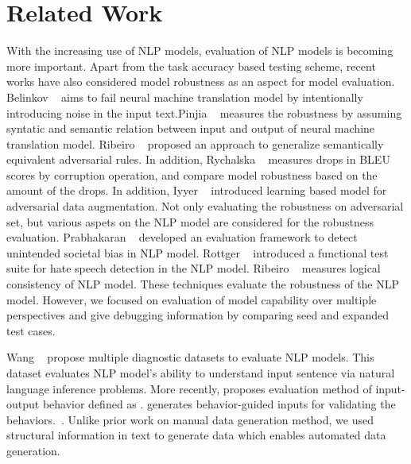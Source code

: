 \section{Related Work}
\label{sec:related}

%
With the increasing use of NLP models, evaluation of NLP models is
becoming more important. Apart from the task accuracy based testing
scheme, recent works have also considered model robustness as an
aspect for model evaluation. Belinkov
\textit{\etal}~\cite{belinkov2018breaknmt} aims to fail neural machine
translation model by intentionally introducing noise in the input
text.Pinjia
\textit{\etal}~\cite{pinjia2020structinvtestingnmt,pinjia2020testnmtrt}
measures the robustness by assuming syntatic and semantic relation
between input and output of neural machine translation model.  Ribeiro
\textit{\etal}~\cite{ribeiro2018sear} proposed an approach to
generalize semantically equivalent adversarial rules. In addition,
Rychalska \textit{\etal}~\cite{rychalska2019wildnlp} measures drops in
BLEU scores by corruption operation, and compare model robustness
based on the amount of the drops. In addition, Iyyer
\textit{\etal}~\cite{iyyer2018adversarial} introduced learning based
model for adversarial data augmentation. Not only evaluating the
robustness on adversarial set, but various aspets on the NLP model are
considered for the robustness evaluation. Prabhakaran
\textit{\etal}~\cite{prabhakaran2019fairness} developed an evaluation
framework to detect unintended societal bias in NLP model. Rottger
\textit{\etal}~\cite{rottger2020hatecheck} introduced a functional
test suite for hate speech detection in the NLP model.  Ribeiro
\textit{\etal}~\cite{ribeiro2019consistencyeval} measures logical
consistency of NLP model. These techniques evaluate the robustness of
the NLP model. However, we focused on evaluation of model capability
over multiple perspectives and give debugging information by comparing
seed and expanded test cases.

%
Wang \textit{\etal}~\cite{wang2018glue, wang2019superglue} propose
multiple diagnostic datasets to evaluate NLP models. This dataset
evaluates NLP model's ability to understand input sentence via natural
language inference problems. More recently, \Cklst proposes evaluation
method of input-output behavior defined as \lcs. \Cklst generates
behavior-guided inputs for validating the
behaviors.~\cite{marcoACL2020checklist}. Unlike prior work on manual
data generation method, we used structural information in text to
generate data which enables automated data generation.

